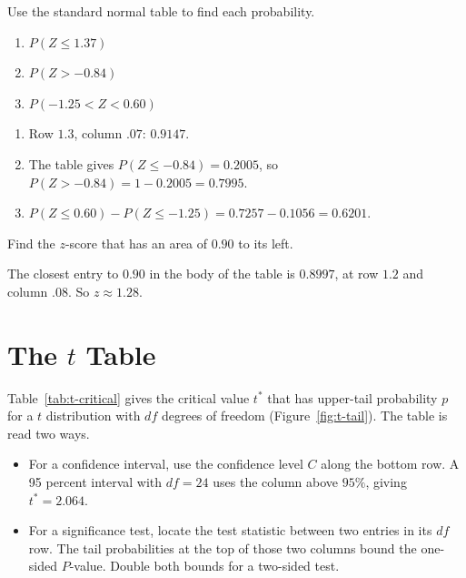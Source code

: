 \begin{Exercise}[title={Areas under the standard normal curve}, label={ex:ztable-areas}]
Use the standard normal table to find each probability.
\begin{enumerate}
    \item[(a)] $P(Z \le 1.37)$
    \item[(b)] $P(Z > -0.84)$
    \item[(c)] $P(-1.25 < Z < 0.60)$
\end{enumerate}
\end{Exercise}

\begin{Answer}[ref={ex:ztable-areas}]
\begin{enumerate}
    \item[(a)] Row $1.3$, column $.07$: $0.9147$.
    \item[(b)] The table gives $P(Z \le -0.84) = 0.2005$, so $P(Z > -0.84) = 1 - 0.2005 = 0.7995$.
    \item[(c)] $P(Z \le 0.60) - P(Z \le -1.25) = 0.7257 - 0.1056 = 0.6201$.
\end{enumerate}
\end{Answer}

\begin{Exercise}[title={From an area back to $z$}, label={ex:ztable-inverse}]
Find the $z$-score that has an area of $0.90$ to its left.
\end{Exercise}

\begin{Answer}[ref={ex:ztable-inverse}]
The closest entry to $0.90$ in the body of the table is $0.8997$, at row $1.2$ and column $.08$. So $z \approx 1.28$.
\end{Answer}

\section{The \texorpdfstring{$t$}{t} Table}

Table~\ref{tab:t-critical} gives the critical value $t^*$ that has upper-tail probability $p$ for a $t$ distribution with $df$ degrees of freedom (Figure~\ref{fig:t-tail}). The table is read two ways.

\begin{itemize}
    \item For a confidence interval, use the confidence level $C$ along the bottom row. A 95 percent interval with $df = 24$ uses the column above $95\%$, giving $t^* = 2.064$.
    \item For a significance test, locate the test statistic between two entries in its $df$ row. The tail probabilities at the top of those two columns bound the one-sided $P$-value. Double both bounds for a two-sided test.
\end{itemize}

